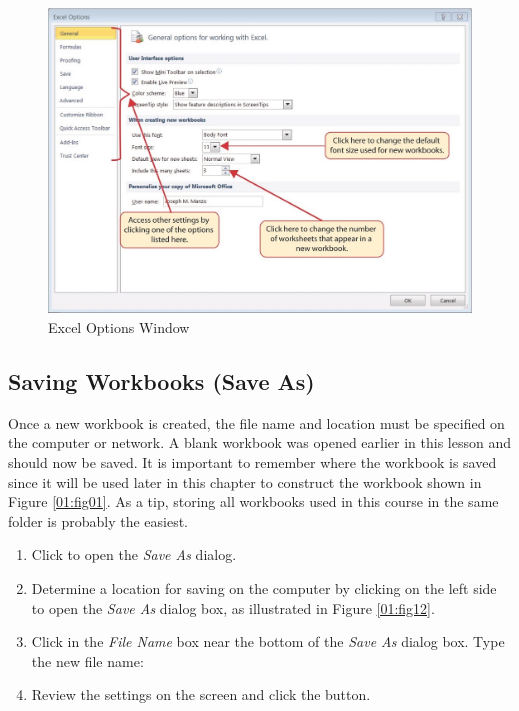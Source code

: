\begin{figure}[H]
	\centering
	\includegraphics[width=\maxwidth{.95\linewidth}]{gfx/ch01_fig10}
	\caption{Excel Options Window}
	\label{01:fig10}
\end{figure}

\subsection{Saving Workbooks (Save As)}

Once a new workbook is created, the file name and location must be specified on the computer or network. A blank workbook was opened earlier in this lesson and should now be saved. It is important to remember where the workbook is saved since it will be used later in this chapter to construct the workbook shown in Figure \ref{01:fig01}. As a tip, storing all workbooks used in this course in the same folder is probably the easiest.

\begin{enumbox}
	\begin{enumerate}
		\item Click  to open the \textit{Save As} dialog.
		\item Determine a location for saving on the computer by clicking  on the left side to open the \textit{Save As} dialog box, as illustrated in Figure \ref{01:fig12}.
		\item Click in the \textit{File Name} box near the bottom of the \textit{Save As} dialog box. Type the new file name: 
		\item Review the settings on the screen and click the  button.
	\end{enumerate}
\end{enumbox}

